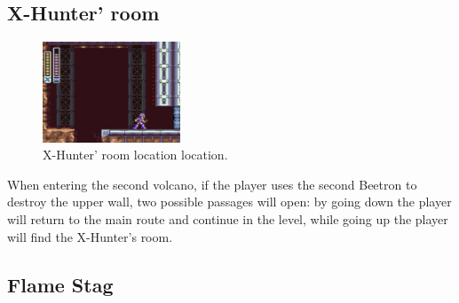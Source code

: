 \subsection{X-Hunter' room}
\begin{figure}[htp]
	\centering
	\includegraphics[height=3cm]{figures/X2/Flame_stag/Stag_Hunter_room.png}
	\caption{X-Hunter' room location location.}
\end{figure}
When entering the second volcano, if the player uses the second Beetron to destroy the upper wall, two possible passages will open: by going down the player will return to the main route and continue in the level, while going up the player will find the X-Hunter's room.


\subsection{Flame Stag}\label{boss:Flame_stag}

